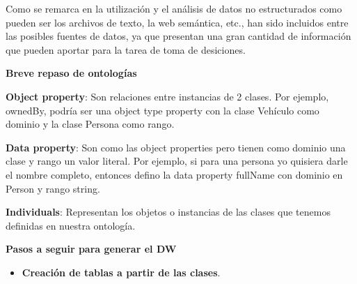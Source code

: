 \documentclass{fancyslides}
\begin{document}
\begin{frame}
\end{frame}

\begin{frame}
\misc
{ 
\justifying Como se remarca en \cite{OntologyPaper} la utilización y el análisis de datos no estructurados como pueden ser los archivos de texto, la web semántica, etc., han sido incluidos entre las posibles fuentes de datos, ya que presentan una gran cantidad de información que pueden aportar para la tarea de toma de desiciones.

}
\end{frame}

\begin{frame}
\misc
{ \textbf{\Large Breve repaso de ontologías}
\newline
\newline

\justifying \textbf{Object property}: Son relaciones entre instancias de 2 clases. Por ejemplo, ownedBy, podría ser una object type property con la clase Vehículo como dominio y la clase Persona como rango.

\justifying \textbf{Data property}: Son como las object properties pero tienen como dominio una clase y rango un valor literal. Por ejemplo, si para una persona yo quisiera darle el nombre completo, entonces defino la data property fullName con dominio en Person y rango string.

\justifying \textbf{Individuals}: Representan los objetos o instancias de las clases que tenemos definidas en nuestra ontología.

}
\end{frame}


\begin{frame}
\misc
{ \textbf{\Large Pasos a seguir para generar el DW}
\newline
\newline

\begin{itemize}
  \item \textbf{Creación de tablas a partir de las clases}.
\end{itemize}


}
\end{frame}
\end{document}
